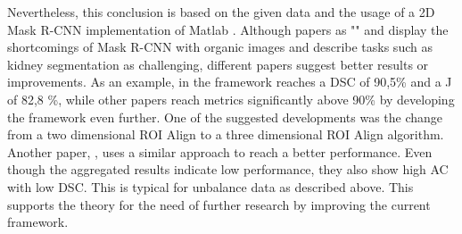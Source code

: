 Nevertheless, this conclusion is based on the given data and the usage of a 2D Mask R-CNN implementation of Matlab \cite{GitHub.25Aug22, .25Aug22}. Although papers as "" \cite{Vuola.29Jan19}  and    \cite{OvergaardLauersen.2021} display the shortcomings of Mask R-CNN with organic images and describe tasks such as kidney segmentation as challenging, different papers suggest better results or improvements. As an example, in  \cite{Goyal.2022} the framework reaches a \ac{DSC} of 90,5\% and a \ac{J} of 82,8 \%, while other papers \cite{Chen., Shu.2020} reach metrics significantly above 90\%  by developing the framework even further. 
One of the suggested developments was the change from a two dimensional ROI Align to a three dimensional ROI Align algorithm. Another paper,  \cite{Nazari.2021}, uses a similar approach to reach a better performance.  Even though the aggregated results indicate low performance, they also show high \ac{AC} with low \ac{DSC}. This is typical for unbalance data as described above. This supports the theory for the need of further research by improving the current framework.